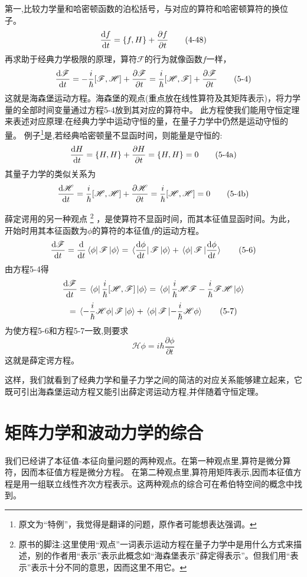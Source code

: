 第一,比较力学量和哈密顿函数的泊松括号，与对应的算符和哈密顿算符的换位子。
\[\dv{f}{t}=\{f,H\}+\frac{\partial f}{\partial t} \tag{4-48}\]
再求助于经典力学极限的原理，算符$\mathscr{F}$的行为就像函数$f$一样，
\[\dv{\mathscr{F}}{t}=-\frac{i}{\hbar}[\mathscr{F},\mathscr{H}]+\frac{\partial \mathscr{F}}{\partial t}=\frac{i}{\hbar}[\mathscr{H},\mathscr{F}]+\frac{\partial \mathscr{F}}{\partial t} \tag{5-4}\]
这就是海森堡运动方程。海森堡的观点(重点放在线性算符及其矩阵表示)，将力学量的全部时间变量通过方程5-4放到其对应的算符中。
此方程使我们能用守恒定理来表述对应原理:在经典力学中运动守恒的量，在量子力学中仍然是运动守恒的量。
例子\footnote{原文为“特例”，我觉得是翻译的问题，原作者可能想表达强调。}是,若经典哈密顿量不显函时间，则能量是守恒的:
\[\dv{H}{t}=\{H,H\}+\frac{\partial H}{\partial t}=\{H,H\}=0 \tag{5-4a}\]
其量子力学的类似关系为
\[\dv{\mathscr{H}}{t}=\frac{i}{\hbar}[\mathscr{H},\mathscr{H}]+\frac{\partial \mathscr{H}}{\partial t}=\frac{i}{\hbar}[\mathscr{H},\mathscr{H}]=0 \tag{5-4b}\]

薛定谔用的另一种观点
\footnote{原书的脚注:这里使用“观点”一词表示运动方程在量子力学中是用什么方式来描述，别的作者用“表示”表示此概念如“海森堡表示”薛定得表示”。但我们用“表示”表示十分不同的意思，因而这里不用它。}
，是使算符不显函时间，而其本征值显函时间。为此，开始时用其本征函数为$\phi$的算符的本征值$f$的运动方程。
\[\dv{\mathscr{F}}{t}=\dv{t}\bra*{\phi}\mathscr{F}\ket*{\phi}=\bra*{\dv{\phi}{t}}\mathscr{F}\ket*{\phi}+\bra*{\phi}\mathscr{F}\ket*{\dv{\phi}{t}} \tag{5-6}\]
由方程5-4得
\[\dv{\mathscr{F}}{t}=\bra*{\phi}\frac{i}{\hbar}[\mathscr{H},\mathscr{F}]\ket*{\phi}=\bra*{\phi}\frac{i}{\hbar}\mathscr{H}\mathscr{F}-\frac{i}{\hbar}\mathscr{F}\mathscr{H}\ket*{\phi}\]
\[=\bra*{-\frac{i}{\hbar}\mathscr{H}\phi}\mathscr{F}\ket*{\phi}+\bra*{\phi}\mathscr{F}\ket*{-\frac{i}{\hbar}\mathscr{H}\phi} \tag{5-7}\]
为使方程5-6和方程5-7一致,则要求
\[\mathscr{H}\phi=i\hbar\frac{\partial \phi}{\partial t} \tag{5-8}\]
这就是薛定谔方程。

这样，我们就看到了经典力学和量子力学之间的简洁的对应关系能够建立起来，它既可引出海森堡运动方程又能引出薛定谔运动方程,并伴随着守恒定理。

\section{矩阵力学和波动力学的综合}
我们已经讲了本征值-本征向量问题的两种观点。在第一种观点里,算符是微分算符，因而本征值方程是微分方程。
在第二种观点里,算符用矩阵表示,因而本征值方程是用一组联立线性齐次方程表示。这两种观点的综合可在希伯特空间的概念中找到。

